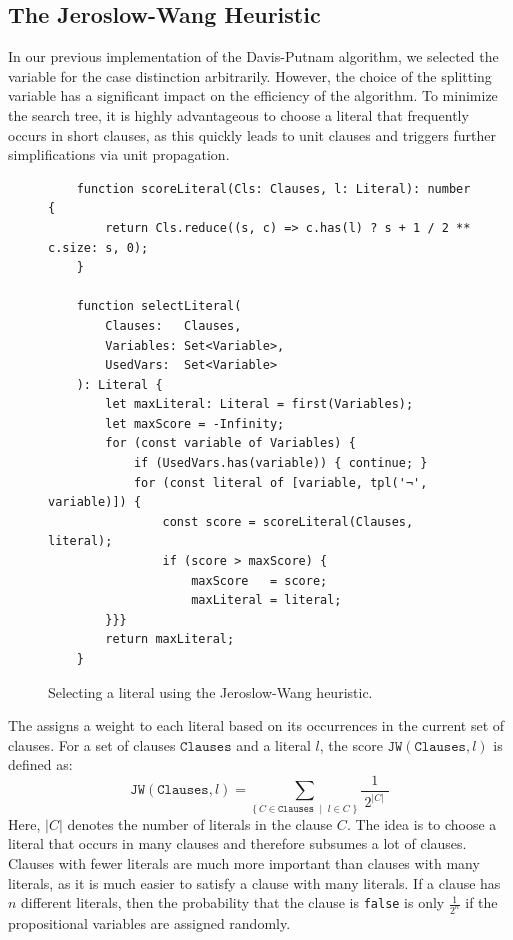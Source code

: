 \subsection{The Jeroslow-Wang Heuristic}
In our previous implementation of the Davis-Putnam algorithm, we selected the variable for the case distinction
arbitrarily. However, the choice of the splitting variable has a significant impact on the efficiency of the
algorithm. To minimize the search tree, it is highly advantageous to choose a literal that frequently occurs in
short clauses, as this quickly leads to unit clauses and triggers further simplifications via unit propagation. 
 

\begin{figure}[!ht]
  \centering
\begin{verbatim}
    function scoreLiteral(Cls: Clauses, l: Literal): number {
        return Cls.reduce((s, c) => c.has(l) ? s + 1 / 2 ** c.size: s, 0);
    }
    
    function selectLiteral(
        Clauses:   Clauses,
        Variables: Set<Variable>,
        UsedVars:  Set<Variable>
    ): Literal {
        let maxLiteral: Literal = first(Variables);
        let maxScore = -Infinity;
        for (const variable of Variables) {
            if (UsedVars.has(variable)) { continue; }
            for (const literal of [variable, tpl('¬', variable)]) {
                const score = scoreLiteral(Clauses, literal);
                if (score > maxScore) {
                    maxScore   = score;
                    maxLiteral = literal;
        }}}    
        return maxLiteral;
    }
\end{verbatim}
\vspace*{-0.3cm}
  \caption{Selecting a literal using the Jeroslow-Wang heuristic.}
  \label{fig:selectLiteral}
\end{figure}
The  assigns a weight to each literal based on its occurrences in the current set of clauses. For a set of clauses $\texttt{Clauses}$ and a literal $l$, the score $\texttt{JW}(\texttt{Clauses}, l)$ is defined as:
$$ \texttt{JW}(\texttt{Clauses}, l) = \sum\limits_{\bigl\{\,C \in \texttt{Clauses}\;\mid\; l \in C\;\bigr\}} \frac{1}{\;2^{|C|}\;} $$
Here, $|C|$ denotes the number of literals in the clause $C$.
The idea is to choose a literal that occurs in many clauses and therefore subsumes a lot of clauses.  Clauses
with fewer literals are much more important than clauses with many literals, as it is much easier to satisfy a
clause with many literals.  If a clause has $n$ different literals, then the probability that the clause is
\texttt{false} is only $\displaystyle\frac{1}{2^n}$ if the propositional variables are assigned randomly. 


